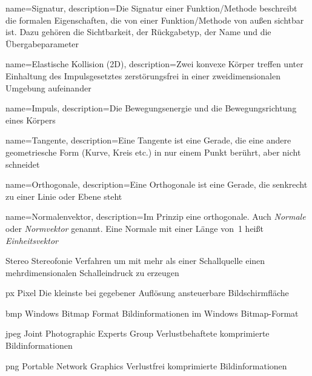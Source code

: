 {
	name={Signatur},
	description={Die Signatur einer Funktion/Methode beschreibt die formalen Eigenschaften, die von einer Funktion/Methode von außen sichtbar ist. Dazu gehören die Sichtbarkeit, der Rückgabetyp, der Name und die Übergabeparameter} 
}

{
	name={Elastische Kollision (2D)},
	description={Zwei konvexe Körper treffen unter Einhaltung des Impulsgesetztes zerstörungsfrei in einer zweidimensionalen Umgebung aufeinander} 
}

{
	name={Impuls},
	description={Die Bewegungsenergie und die Bewegungsrichtung eines Körpers} 
}

{
	name={Tangente},
	description={Eine Tangente ist eine Gerade, die eine andere geometriesche Form (Kurve, Kreis etc.) in nur einem Punkt berührt, aber nicht schneidet}
}

{
	name={Orthogonale},
	description={Eine Orthogonale ist eine Gerade, die senkrecht zu einer Linie oder Ebene steht}
}

{
	name={Normalenvektor},
	description={Im Prinzip eine \gls{orthogonale}. Auch \emph{Normale} oder \emph{Normvektor} genannt. Eine Normale mit einer Länge von~1 heißt \emph{Einheitsvektor}}
}




  {Stereo}            %
  {Stereofonie}  %
  {Verfahren um mit mehr als einer Schallquelle einen mehrdimensionalen Schalleindruck zu erzeugen} %

  {px}            %
  {Pixel}  %
  {Die kleinste bei gegebener Auflösung ansteuerbare Bildschirmfläche} %

  {bmp}            %
  {Windows Bitmap Format}  %
  {Bildinformationen im Windows Bitmap-Format} %

  {jpeg}            %
  {Joint Photographic Experts Group}  %
  {Verlustbehaftete komprimierte Bildinformationen} %

  {png}            %
  {Portable Network Graphics}  %
  {Verlustfrei komprimierte Bildinformationen} %

